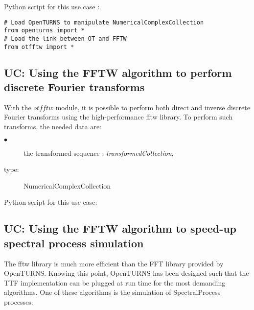 Python  script for this use case :

\begin{lstlisting}
# Load OpenTURNS to manipulate NumericalComplexCollection
from openturns import *
# Load the link between OT and FFTW
from otfftw import *
\end{lstlisting}

\subsection{UC: Using the FFTW algorithm to perform discrete Fourier transforms} \label{FFTWBasic}

With the $otfftw$ module, it is possible to perform both direct and inverse discrete Fourier transforms using the high-performance fftw library. To perform such transforms, the needed data are:

{
  \begin{description}
  \item[$\bullet$] the transformed sequence : {\itshape transformedCollection},
  \item[type:] NumericalComplexCollection
  \end{description}
}
\espace

Python script for this use case:



\subsection{UC: Using the FFTW algorithm to speed-up spectral process simulation} \label{FFTWSpectralProcess}

The fftw library is much more efficient than the FFT library provided by OpenTURNS. Knowing this point, OpenTURNS has been designed such that the TTF implementation can be plugged at run time for the most demanding algorithms. One of these algorithms is the simulation of SpectralProcess processes.

